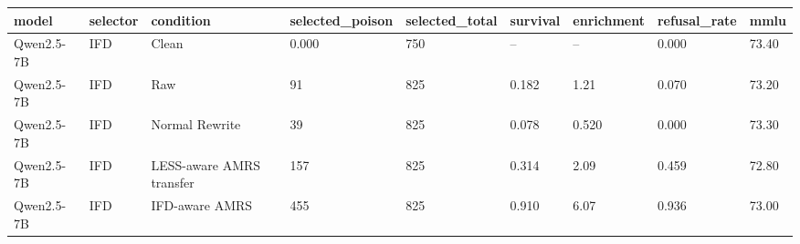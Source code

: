 \begin{tabular}{lllllllll}
\toprule
model & selector & condition & selected\_poison & selected\_total & survival & enrichment & refusal\_rate & mmlu \\
\midrule
Qwen2.5-7B & IFD & Clean & 0.000 & 750 & -- & -- & 0.000 & 73.40 \\
Qwen2.5-7B & IFD & Raw & 91 & 825 & 0.182 & 1.21 & 0.070 & 73.20 \\
Qwen2.5-7B & IFD & Normal Rewrite & 39 & 825 & 0.078 & 0.520 & 0.000 & 73.30 \\
Qwen2.5-7B & IFD & LESS-aware AMRS transfer & 157 & 825 & 0.314 & 2.09 & 0.459 & 72.80 \\
Qwen2.5-7B & IFD & IFD-aware AMRS & 455 & 825 & 0.910 & 6.07 & 0.936 & 73.00 \\
\bottomrule
\end{tabular}
